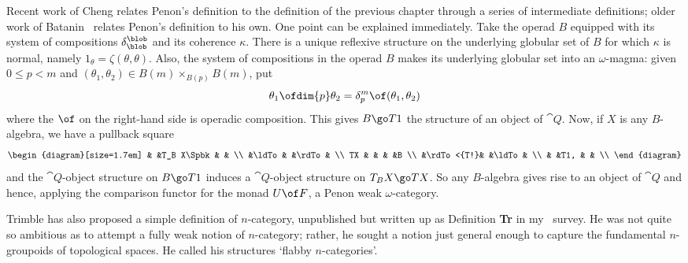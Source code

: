 Recent work of Cheng%
%
%
relates Penon's definition to the definition of the
previous chapter through a series of intermediate definitions; older work
of Batanin~\cite{BatPMW}%
%
%
%
%
relates Penon's definition to his own.  One point
can be explained immediately.  Take the operad $B$ equipped with its system
of compositions $\delta^\blob_\blob$ and its coherence $\kappa$.  There is
a unique reflexive structure on the underlying globular set of $B$ for
which $\kappa$ is normal, namely $1_\theta = \zeta(\theta, \theta)$.  Also,
the system of compositions in the operad $B$ makes its underlying globular
set into an $\omega$-magma: given $0\leq p < m$ and $(\theta_1, \theta_2)
\in B(m) \times_{B(p)} B(m)$, put
\[
\theta_1 \ofdim{p} \theta_2 
=
\delta^m_p \of (\theta_1, \theta_2)
\]
where the $\of$ on the right-hand side is operadic composition.  This gives
$B \go T1$ the structure of an object of $\cat{Q}$.  Now, if $X$ is any
$B$-algebra, we have a pullback square
\[
\begin{diagram}[size=1.7em]
	&	&T_B X\Spbk&	&	\\
	&\ldTo  &	&\rdTo	&	\\
TX	&	&	&	&B	\\
	&\rdTo<{T!}&	&\ldTo  &	\\
	&	&T1,	&	&	\\
\end{diagram}
\]
and the $\cat{Q}$-object structure on $B \go T1$ induces a $\cat{Q}$-object
structure on $T_B X \go TX$.  So any $B$-algebra gives rise to an object
of $\cat{Q}$ and hence, applying the comparison functor for the monad $U\of
F$, a Penon weak $\omega$-category.%
%
%
%
%




%
%
%
%
%
%
%
%
%
%


Trimble has also proposed a simple definition of $n$-category, unpublished
but written up as Definition \textbf{Tr} in my~\cite{SDN} survey.  He was
not quite so ambitious as to attempt a fully weak notion of $n$-category;
rather, he sought a notion just general enough to capture the fundamental
$n$-groupoids of topological spaces.  He called his structures `flabby
$n$-categories'.

